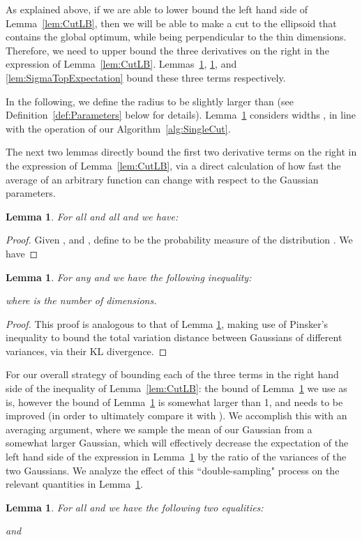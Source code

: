 \documentclass[11pt,letter]{article}
\newcounter{nTheorems}
\numberwithin{nTheorems}{section}
\newtheorem{lemma}[nTheorems]{Lemma}
\begin{document}
As explained above, if we are able to lower bound the left hand side of Lemma~\ref{lem:CutLB}, then we will be able to make a cut to the ellipsoid that contains the global optimum, while being perpendicular to the thin dimensions.
Therefore, we need to upper bound the three derivatives on the right in the expression of Lemma~\ref{lem:CutLB}.
Lemmas~\ref{lem:MovingInThinDimension}, \ref{lem:Isoperimetric}, and \ref{lem:SigmaTopExpectation} bound these three terms respectively.

In the following, we define the radius  to be slightly larger than  (see Definition~\ref{def:Parameters} below for details).
Lemma~\ref{lem:MovingInThinDimension} considers widths , in line with the operation of our Algorithm~\ref{alg:SingleCut}.

The next two lemmas directly bound the first two derivative terms on the right in the expression of Lemma~\ref{lem:CutLB}, via a direct calculation of how fast the average of an arbitrary function can change with respect to the Gaussian parameters.

\begin{lemma}
\label{lem:MovingInThinDimension}
For all  and all  and  we have:

\end{lemma}

\begin{proof}
Given ,  and , define  to be the probability measure of the distribution . We have

\end{proof}

\begin{lemma}
\label{lem:Isoperimetric}
For any  and  we have the following inequality:

where  is the number of  dimensions.
\end{lemma}

\begin{proof}
This proof is analogous to that of Lemma \ref{lem:MovingInThinDimension}, making use of Pinsker's inequality to bound the total variation distance between Gaussians of different variances, via their KL divergence.
\end{proof}

For our overall strategy of bounding each of the three terms in the right hand side of the inequality of Lemma~\ref{lem:CutLB}: the bound of Lemma~\ref{lem:MovingInThinDimension} we use as is, however the bound of Lemma~\ref{lem:Isoperimetric} is somewhat larger than 1, and needs to be improved (in order to ultimately compare it with ). We accomplish this with an averaging argument, where we sample the mean of our Gaussian from a somewhat larger Gaussian, which will effectively decrease the expectation of the left hand side of the expression in Lemma~\ref{lem:Isoperimetric} by the ratio of the variances of the two Gaussians. We analyze the effect of this ``double-sampling" process on the relevant quantities in Lemma~\ref{lem:DoubleSampling}.
\begin{lemma}
\label{lem:DoubleSampling}
For all  and  we have the following two equalities:

and
\end{lemma}
\end{document}
